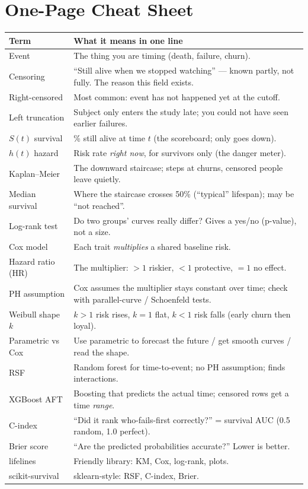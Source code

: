 \documentclass[11pt]{article}
\begin{document}
\section{One-Page Cheat Sheet}
\begin{center}
\renewcommand{\arraystretch}{1.35}
\begin{tabular}{@{}p{3.1cm}p{12.3cm}@{}}
\toprule
\textbf{Term} & \textbf{What it means in one line} \\
\midrule
Event & The thing you are timing (death, failure, churn). \\
Censoring & ``Still alive when we stopped watching'' --- known partly, not fully. The reason this field exists. \\
Right-censored & Most common: event has not happened yet at the cutoff. \\
Left truncation & Subject only enters the study late; you could not have seen earlier failures. \\
$S(t)$ survival & \% still alive at time $t$ (the scoreboard; only goes down). \\
$h(t)$ hazard & Risk rate \emph{right now}, for survivors only (the danger meter). \\
Kaplan--Meier & The downward staircase; steps at churns, censored people leave quietly. \\
Median survival & Where the staircase crosses 50\% (``typical'' lifespan); may be ``not reached''. \\
Log-rank test & Do two groups' curves really differ? Gives a yes/no (p-value), not a size. \\
Cox model & Each trait \emph{multiplies} a shared baseline risk. \\
Hazard ratio (HR) & The multiplier: $>1$ riskier, $<1$ protective, $=1$ no effect. \\
PH assumption & Cox assumes the multiplier stays constant over time; check with parallel-curve / Schoenfeld tests. \\
Weibull shape $k$ & $k>1$ risk rises, $k=1$ flat, $k<1$ risk falls (early churn then loyal). \\
Parametric vs Cox & Use parametric to forecast the future / get smooth curves / read the shape. \\
RSF & Random forest for time-to-event; no PH assumption; finds interactions. \\
XGBoost AFT & Boosting that predicts the actual time; censored rows get a time \emph{range}. \\
C-index & ``Did it rank who-fails-first correctly?'' = survival AUC (0.5 random, 1.0 perfect). \\
Brier score & ``Are the predicted probabilities accurate?'' Lower is better. \\
lifelines & Friendly library: KM, Cox, log-rank, plots. \\
scikit-survival & sklearn-style: RSF, C-index, Brier. \\
\bottomrule
\end{tabular}
\end{center}
\end{document}
